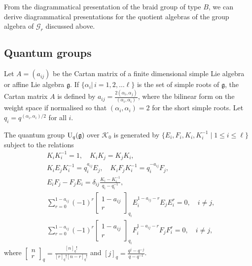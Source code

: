\documentclass[12pt]{amsart}
\theoremstyle{definition}
\theoremstyle{remark}
\numberwithin{equation}{section}
\newcommand{\CG}{{\mathcal G}}
\newcommand{\CK}{{\mathcal K}}
\newcommand{\mf}{\mathfrak}
\newcommand{\fg}{{\mf g}}
\newcommand{\U}{{\rm{U}}}
\begin{document}
From the diagrammatical presentation of the braid group of type $B$, we can derive diagrammatical
 presentations for the quotient algebras of the group algebra of $\CG_r$ discussed above.  





%
\subsection{Quantum groups}
%
%


Let $A=(a_{i j})$ be the Cartan matrix of a finite dimensional simple 
Lie algebra or  affine
 Lie algebra $\fg$.  If $\{\alpha_i\vert\, i=1, 2, \dots\ell\}$ is the set of simple 
roots of $\fg$, the Cartan matrix 
$A$ is defined by $a_{i j} = \frac{2(\alpha_i, \alpha_j)}{(\alpha_i, \alpha_i)}$, 
where the bilinear form on 
the weight space if normalised so that $(\alpha_i, \alpha_i)=2$ for the short 
simple roots. Let $q_i=q^{(\alpha_i, \alpha_i)/2}$ for all $i$. 

The quantum group $\U_q(\fg)$ over $\CK_0$ is generated by 
$\{E_i, F_i, K_i, K_i^{-1}\mid 1\le i\le \ell\}$ subject to the relations 
\begin{eqnarray}
& K_i K_i^{-1}=1, \quad K_i K_j = K_j K_i,  \label{eq:KK}\\
&K_i E_j K_i^{-1}= q_i^{a_{i j}} E_j, \quad K_i F_j K_i^{-1}= q_i^{-a_{i j}} F_j, \label{eq:KEKF}\\
&E_i F_j - F_j E_i = \delta_{i j}  \frac{K_i - K_i^{-1}}{q_i-q_i^{-1}}, \label{eq:EF}\\
&\sum\limits_{r=0}^{1-a_{i j}} (-1)^r \begin{bmatrix}1-a_{i j}\\ r\end{bmatrix}_{q_i} E_i^{1-a_{i j}-r} 
E_j E_i^r=0, \quad i\ne j, \label{eq:Serre-E}\\
&\sum\limits_{r=0}^{1-a_{i j}} (-1)^r \begin{bmatrix}1-a_{i j}\\ r\end{bmatrix}_{q_i} F_i^{1-a_{i j}-r} 
F_j F_i^r=0, \quad i\ne j,  \label{eq:Serre-F}
\end{eqnarray}
where $\begin{bmatrix}n\\ r\end{bmatrix}_q=\frac{[n]_q!}{[r]_q![n-r]_q!}$ and $[j]_q=\frac{q^j- q^{-j}}{q-q^{-1}}$.  
\end{document}
